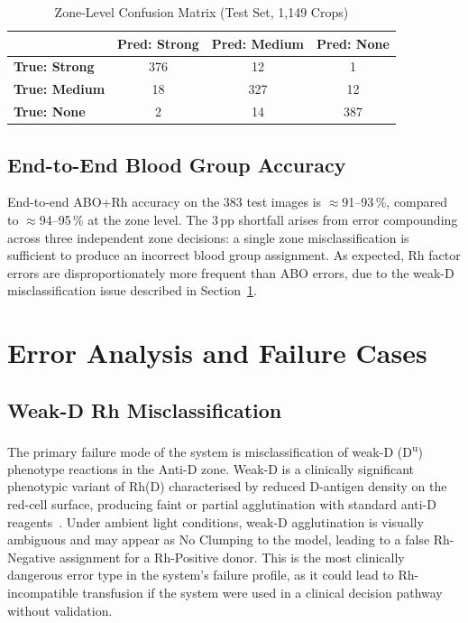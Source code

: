 \documentclass[journal]{IEEEtran}
\begin{document}
\begin{table}[htbp]
  \caption{Zone-Level Confusion Matrix (Test Set, 1,149 Crops)}
  \label{tab:confusion}
  \centering
  \renewcommand{\arraystretch}{1.1}
  \begin{tabular}{lccc}
    \toprule
    & \textbf{Pred: Strong} & \textbf{Pred: Medium} & \textbf{Pred: None} \\
    \midrule
    \textbf{True: Strong} & 376 & 12 & 1 \\
    \textbf{True: Medium} & 18  & 327 & 12 \\
    \textbf{True: None}   & 2   & 14  & 387 \\
    \bottomrule
  \end{tabular}
\end{table}

\subsection{End-to-End Blood Group Accuracy}

End-to-end ABO+Rh accuracy on the 383 test images is
$\approx$91--93\,\%, compared to $\approx$94--95\,\% at the zone
level.
The 3\,pp shortfall arises from error compounding across three
independent zone decisions: a single zone misclassification is
sufficient to produce an incorrect blood group assignment.
As expected, Rh factor errors are disproportionately more frequent
than ABO errors, due to the weak-D misclassification issue
described in Section~\ref{sec:error}.

\section{Error Analysis and Failure Cases}
\label{sec:error}

\subsection{Weak-D Rh Misclassification}

The primary failure mode of the system is misclassification of
weak-D (D\textsuperscript{u}) phenotype reactions in the Anti-D zone.
Weak-D is a clinically significant phenotypic variant of Rh(D)
characterised by reduced D-antigen density on the red-cell surface,
producing faint or partial agglutination with standard anti-D
reagents~\cite{harmening2019}.
Under ambient light conditions, weak-D agglutination is visually
ambiguous and may appear as No Clumping to the model, leading to
a false Rh-Negative assignment for a Rh-Positive donor.
This is the most clinically dangerous error type in the system's
failure profile, as it could lead to Rh-incompatible transfusion
if the system were used in a clinical decision pathway without
validation.
\end{document}
